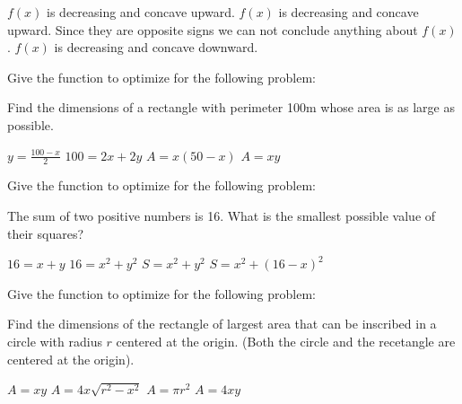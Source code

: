 \documentclass[addpoints, 12pt]{exam}%
\newcommand{\spc}{\vspace*{0.5cm}}
\begin{document}
\begin{questions}
\begin{multicols}{2}
\begin{choices}
\choice $f(x)$ is decreasing and concave upward.
\CorrectChoice $f(x)$ is decreasing and concave upward.
\choice Since they are opposite signs we can not conclude anything about $f(x)$.
\choice $f(x)$ is decreasing and concave downward.
\end{choices}
\end{multicols}

\spc

\question[1]

Give the function to optimize for the following problem:

Find the dimensions of a rectangle with perimeter 100m whose area is as large as possible. 

\begin{multicols}{2}
\begin{choices}
\choice $y = \frac{100-x}{2}$
\choice $100 = 2x+2y$
\CorrectChoice $A = x(50-x)$
\choice $A = xy$
\end{choices}
\end{multicols}

\spc

\question[1]

Give the function to optimize for the following problem:

The sum of two positive numbers is 16. What is the smallest possible value of their squares?

\begin{multicols}{2}
\begin{choices}
\choice $16 = x + y$
\choice $16 = x^2 + y^2$
\choice $S = x^2 + y^2$
\CorrectChoice $S = x^2 + (16-x)^2$
\end{choices}
\end{multicols}

\question[1]

Give the function to optimize for the following problem:

Find the dimensions of the rectangle of largest area that can be inscribed in a circle with radius $r$ centered at the origin. (Both the circle and the recetangle are centered at the origin).

\begin{multicols}{2}
\begin{choices}
\choice $A = xy$
\CorrectChoice $A = 4x\sqrt{r^2 - x^2}$
\choice $A = \pi r^2$
\choice $A = 4xy$
\end{choices}
\end{multicols}


\end{questions}
\end{document}
